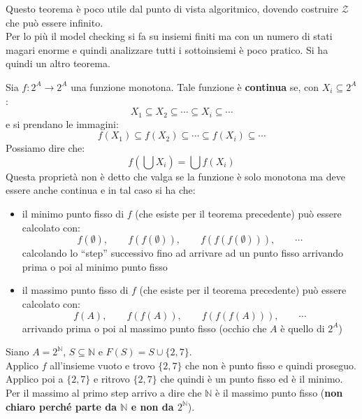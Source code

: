 Questo teorema è poco utile dal punto di vista algoritmico, dovendo costruire
$\mathcal{Z}$ che può essere infinito.\\
Per lo più il model checking si fa su insiemi finiti ma con un numero di stati
magari enorme e quindi analizzare tutti i sottoinsiemi è poco pratico. Si ha
quindi un altro teorema.
\begin{teorema}[di Kleene]
  Sia $f:2^A\to 2^A$ una funzione monotona. Tale funzione è \textbf{continua}
  se, con $X_i\subseteq 2^A$:
  \[X_1\subseteq X_2\subseteq\cdots\subseteq X_i\subseteq\cdots\]
  e si prendano le immagini:
  \[f(X_1)\subseteq f(X_2)\subseteq\cdots\subseteq f(X_i)\subseteq\cdots\]
  Possiamo dire che:
  \[f\left(\bigcup X_i\right)=\bigcup f(X_i)\]
  Questa proprietà non è detto che valga se la funzione è solo monotona ma deve
  essere anche continua e in tal caso si ha che:
  \begin{itemize}
    \item il minimo punto fisso di $f$ (che esiste per il teorema precedente)
    può essere calcolato con:
    \[f(\emptyset),\qquad f(f(\emptyset)),\qquad f(f(f(\emptyset))),
      \qquad\cdots\]
    calcolando lo ``step'' successivo fino ad arrivare ad un punto fisso
    arrivando prima o poi al minimo punto fisso 
    \item il massimo punto fisso di $f$ (che esiste per il teorema precedente)
    può essere calcolato con:
    \[f(A),\qquad f(f(A)),\qquad f(f(f(A))),\qquad\cdots\]
    arrivando prima o poi al massimo punto fisso (occhio che $A$ è quello di
    $2^A$) 
  \end{itemize}
\end{teorema}
\begin{esempio}
  Siano $A=2^{\mathbb{N}}$, $S\subseteq\mathbb{N}$ e $F(S)=S\cup \{2, 7\}$.\\
  Applico $f$ all'insieme vuoto e trovo $\{2, 7\}$ che non è punto fisso e quindi
  proseguo. Applico poi a $\{2, 7\}$ e ritrovo $\{2, 7\}$ che quindi è un punto
  fisso ed è il minimo. Per il massimo al primo step arrivo a dire che
  $\mathbb{N}$ è il massimo punto fisso (\textbf{non chiaro perché parte da
    $\mathbb{N}$ e non da $2^{\mathbb{N}}$}).  
\end{esempio}
